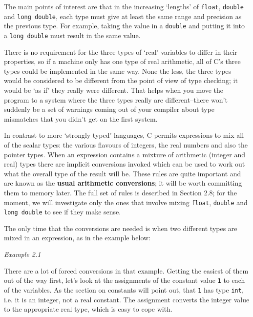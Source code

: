   The main points of interest are that in the increasing `lengths' of
   \texttt{float}, \texttt{double} and \texttt{long double}, each
   type must give at least the same range and precision as the previous type.
   For example, taking the value in a \texttt{double} and putting it into
   a \texttt{long double} must result in the same value.


  There is no requirement for the three types of `real' variables to
   differ in their properties, so if a machine only has one type of real
   arithmetic, all of C's three types could be implemented in the same way.
   None the less, the three types would be considered to be different from the
   point of view of type checking; it would be `as if' they really were
   different. That helps when you move the program to a system where the three
   types really are different--there won't suddenly be a set of
   warnings coming out of your compiler about type mismatches that you didn't
   get on the first system.


  In contrast to more `strongly typed' languages, C permits
   expressions to mix all of the scalar types: the various flavours of
   integers, the real numbers and also the pointer types. When an expression
   contains a mixture of arithmetic (integer and real) types there are
   implicit conversions invoked which can be used to work out what the overall
   type of the result will be. These rules are quite important and are known
   as the \textbf{usual arithmetic conversions}; it will be worth committing
   them to memory later. The full set of rules is described in Section 2.8; for the moment, we will investigate only the ones that involve
   mixing \texttt{float}, \texttt{double} and \texttt{long double}
   to see if they make sense.


  The only time that the conversions are needed is when two different types
   are mixed in an expression, as in the example below:


  \begin{center}\textit{Example 2.1}\end{center}


  There are a lot of forced conversions in that example. Getting the
   easiest of them out of the way first, let's look at the assignments of the
   constant value \texttt{1} to each of the variables. As the section
   on constants will point out, that \texttt{1} has type \texttt{int},
   i.e. it is an integer, not a real constant. The assignment converts the
   integer value to the appropriate real type, which is easy to cope with.


